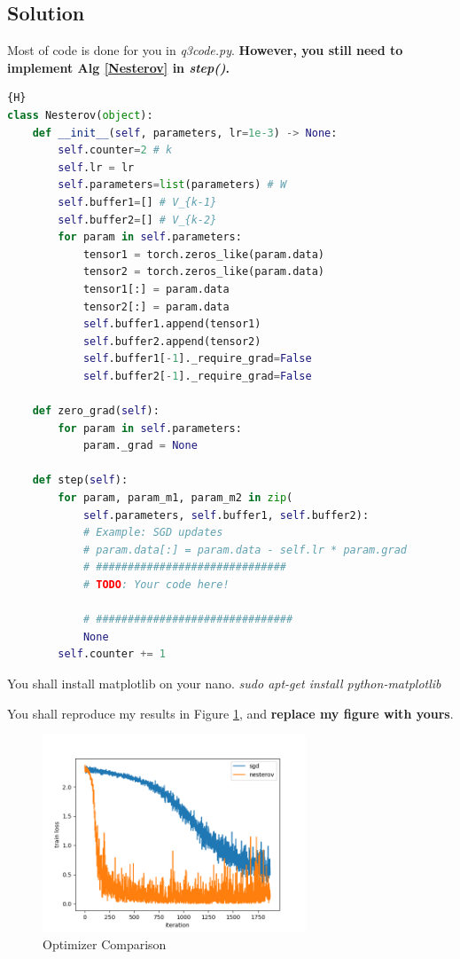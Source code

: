 \documentclass[12pt,a4paper]{article}
\theoremstyle{definition}
\begin{document}
\subsection{Solution}
Most of code is done for you in \textit{q3code.py}. \textbf{However, you still need to implement Alg \ref{Nesterov} in \textit{step()}.}

\begin{lstlisting}[language=Python, caption=Nesterov Optimizer, label=optimizer]{H}
class Nesterov(object):
    def __init__(self, parameters, lr=1e-3) -> None:
        self.counter=2 # k
        self.lr = lr
        self.parameters=list(parameters) # W
        self.buffer1=[] # V_{k-1}
        self.buffer2=[] # V_{k-2}
        for param in self.parameters:
            tensor1 = torch.zeros_like(param.data)
            tensor2 = torch.zeros_like(param.data)
            tensor1[:] = param.data
            tensor2[:] = param.data
            self.buffer1.append(tensor1)
            self.buffer2.append(tensor2)
            self.buffer1[-1]._require_grad=False
            self.buffer2[-1]._require_grad=False
    
    def zero_grad(self):
        for param in self.parameters:
            param._grad = None
    
    def step(self):
        for param, param_m1, param_m2 in zip(
            self.parameters, self.buffer1, self.buffer2):
            # Example: SGD updates
            # param.data[:] = param.data - self.lr * param.grad
            # ##############################
            # TODO: Your code here!

            # ###############################
            None
        self.counter += 1
\end{lstlisting}

You shall install matplotlib on your nano.
\textit{sudo apt-get install python-matplotlib}

You shall reproduce my results in Figure \ref{compare-opt}, and \textbf{replace my figure with yours}.

\begin{figure}[H]
    \centering
    \includegraphics[width=0.7\textwidth]{optimizer.png}
    \caption{Optimizer Comparison}
    \label{compare-opt}
\end{figure}
\end{document}
